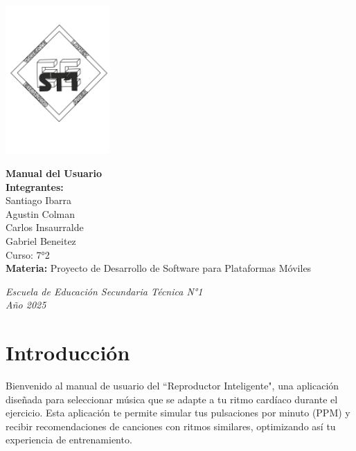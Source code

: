 \documentclass[a4paper,12pt]{article}
\begin{document}
\begin{flushright}
    \includegraphics[width=4cm]{LOGO-EEST1.png} %
\end{flushright}

\vspace*{2cm}

\begin{center}
    {\LARGE\bfseries Manual del Usuario} \\[1.5cm]
    \textbf{Integrantes:} \\[0.3cm]
    Santiago Ibarra \\[0.2cm]
    Agustin Colman \\[0.2cm]
    Carlos Insaurralde \\[0.2cm]
    Gabriel Beneitez \\[1.2cm]
    Curso: 7°2 \\
    \vspace{0.5cm}
    \textbf{Materia:} Proyecto de Desarrollo de Software para Plataformas Móviles
\end{center}

\vfill

\begin{center}
    \textit{Escuela de Educación Secundaria Técnica N°1} \\
    \textit{Año 2025}
\end{center}

\thispagestyle{empty}
\newpage

\tableofcontents
\newpage

\section{Introducción}
Bienvenido al manual de usuario del ``Reproductor Inteligente", una aplicación diseñada para seleccionar música que se adapte a tu ritmo cardíaco durante el ejercicio. Esta aplicación te permite simular tus pulsaciones por minuto (PPM) y recibir recomendaciones de canciones con ritmos similares, optimizando así tu experiencia de entrenamiento.
\end{document}
